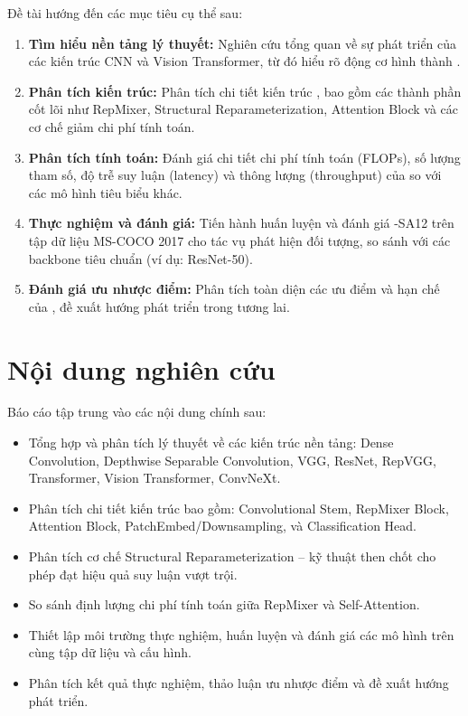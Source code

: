 Đề tài hướng đến các mục tiêu cụ thể sau:

\begin{enumerate}[label=(\roman*)]
    \item \textbf{Tìm hiểu nền tảng lý thuyết:} Nghiên cứu tổng quan về sự phát triển của các kiến trúc CNN và Vision Transformer, từ đó hiểu rõ động cơ hình thành \fastvit{}.
    
    \item \textbf{Phân tích kiến trúc:} Phân tích chi tiết kiến trúc \fastvit{}, bao gồm các thành phần cốt lõi như RepMixer, Structural Reparameterization, Attention Block và các cơ chế giảm chi phí tính toán.
    
    \item \textbf{Phân tích tính toán:} Đánh giá chi tiết chi phí tính toán (FLOPs), số lượng tham số, độ trễ suy luận (latency) và thông lượng (throughput) của \fastvit{} so với các mô hình tiêu biểu khác.
    
    \item \textbf{Thực nghiệm và đánh giá:} Tiến hành huấn luyện và đánh giá \fastvit{}-SA12 trên tập dữ liệu MS-COCO 2017 cho tác vụ phát hiện đối tượng, so sánh với các backbone tiêu chuẩn (ví dụ: ResNet-50).
    
    \item \textbf{Đánh giá ưu nhược điểm:} Phân tích toàn diện các ưu điểm và hạn chế của \fastvit{}, đề xuất hướng phát triển trong tương lai.
\end{enumerate}

\section{Nội dung nghiên cứu}
\label{sec:noidung}

Báo cáo tập trung vào các nội dung chính sau:

\begin{itemize}
    \item Tổng hợp và phân tích lý thuyết về các kiến trúc nền tảng: Dense Convolution, Depthwise Separable Convolution, VGG, ResNet, RepVGG, Transformer, Vision Transformer, ConvNeXt.
    
    \item Phân tích chi tiết kiến trúc \fastvit{} bao gồm: Convolutional Stem, RepMixer Block, Attention Block, PatchEmbed/Downsampling, và Classification Head.
    
    \item Phân tích cơ chế Structural Reparameterization -- kỹ thuật then chốt cho phép \fastvit{} đạt hiệu quả suy luận vượt trội.
    
    \item So sánh định lượng chi phí tính toán giữa RepMixer và Self-Attention.
    
    \item Thiết lập môi trường thực nghiệm, huấn luyện và đánh giá các mô hình trên cùng tập dữ liệu và cấu hình.
    
    \item Phân tích kết quả thực nghiệm, thảo luận ưu nhược điểm và đề xuất hướng phát triển.
\end{itemize}

